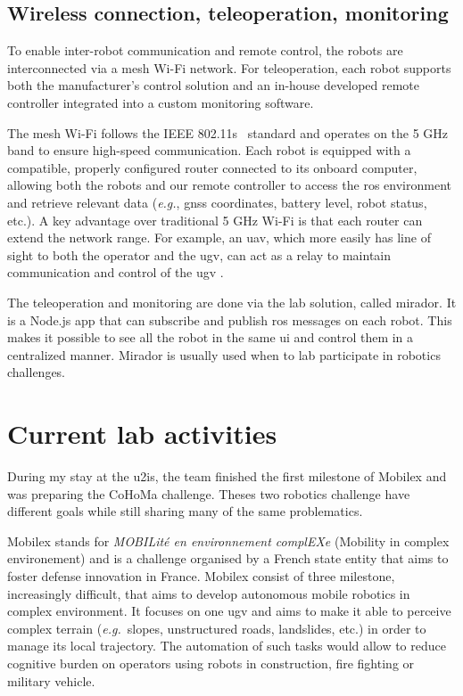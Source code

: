 \subsection{Wireless connection, teleoperation, monitoring}\label{subsec:wireless-connection-teleoperation-monitoring}

To enable inter-robot communication and remote control, the robots are interconnected via a mesh Wi-Fi network.
For teleoperation, each robot supports both the manufacturer's control solution and an in-house developed
remote controller integrated into a custom monitoring software.

The mesh Wi-Fi follows the IEEE 802.11s~\cite{noauthor_ieee_2021} standard and operates on the 5 GHz band to ensure high-speed communication.
Each robot is equipped with a compatible, properly configured router connected to its onboard computer,
allowing both the robots and our remote controller to access the \gls{ros} environment and retrieve relevant
data (\textit{e.g.}, \gls{gnss} coordinates, battery level, robot status, etc.). A key advantage over traditional 5 GHz Wi-Fi is that each router can extend the network range.
For example, an \gls{uav}, which more easily has line of sight to both the operator and the \gls{ugv}, can act as a relay to maintain communication and control of the \gls{ugv}
.

The teleoperation and monitoring are done via the lab solution, called mirador.
It is a Node.js app that can subscribe and publish \gls{ros} messages on each robot.
This makes it possible to see all the robot in the same \gls{ui} and control them in a centralized manner.
Mirador is usually used when to lab participate in robotics challenges.


\section{Current lab activities}\label{sec:current-lab-activities}

During my stay at the \gls{u2is}, the team finished the first milestone of Mobilex and was preparing the CoHoMa challenge.
Theses two robotics challenge have different goals while still sharing many of the same problematics.

Mobilex stands for \textit{MOBILité en environnement complEXe} (Mobility in complex environement) and is a
challenge organised by a French state entity that aims to foster defense innovation in France.
Mobilex consist of three milestone, increasingly difficult, that aims to develop autonomous mobile robotics
in complex environment.
It focuses on one \gls{ugv} and aims to make it able to perceive complex terrain (\textit{e.g.}\ slopes, unstructured roads, landslides, etc.) in
order to manage its local trajectory.
The automation of such tasks would allow to reduce cognitive burden on operators using robots in construction,
fire fighting or military vehicle.


